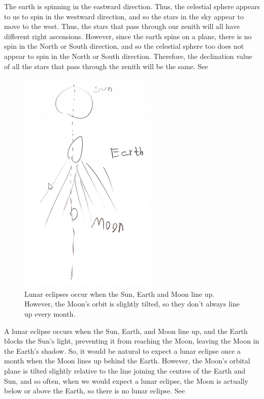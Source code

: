 \documentclass{templates/homework}
\begin{document}
The earth is spinning in the eastward direction. Thus, the
celestial sphere appears to us to spin in the westward direction, and so the stars
in the sky appear to move to the west. Thus, the stars that pass through our zenith
will all have different right ascensions. However, since the earth spins on a plane, there
is no spin in the North or South direction, and so the celestial sphere too does not appear to spin
in the North or South direction. Therefore, the declination value of all the stars that pass
through the zenith will be the same. See 
\exercisepart
\begin{figure}[t]
    \includegraphics[]{diagrams/rsz_figure2.png}
    \caption{Lunar eclipses occur when the Sun, Earth and Moon line up.
    However, the Moon's orbit is slightly tilted, so they don't always
    line up every month.}
    \label{fig:2}
\end{figure}
A lunar eclipse occurs when the Sun, Earth, and Moon line up,
and the Earth blocks the Sun's light, preventing it from reaching the
Moon, leaving the Moon in the Earth's shadow. So, it would be natural to
expect a lunar eclipse once a month when the Moon lines up behind the Earth.
However, the Moon's orbital plane is tilted slightly relative to the line joining
the centres of the Earth and Sun, and so often, when we would expect a lunar eclipse,
the Moon is actually below or above the Earth, so there is no lunar eclipse.
See 
\exercisepart
\end{document}
